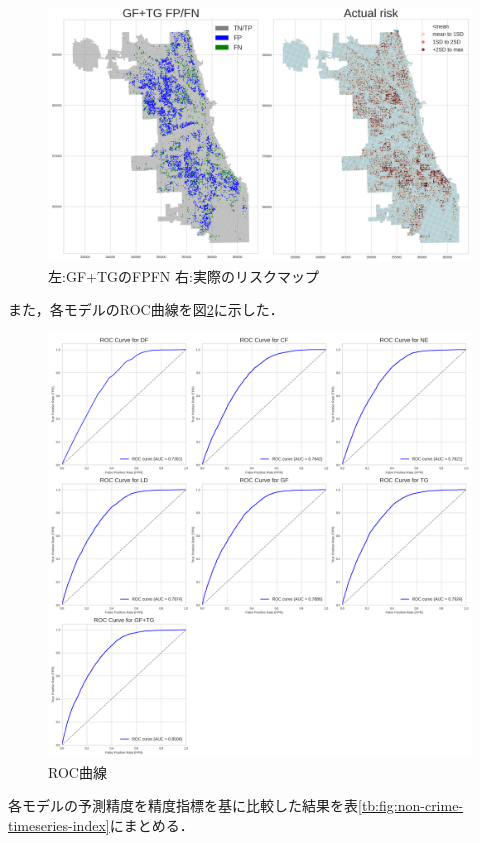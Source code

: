 \begin{figure}
  \centering %
  \includegraphics[scale=0.25]{./non-crime-timeseries-fig/GF+TG_fnp.png}
  \caption{左:GF+TGのFPFN 右:実際のリスクマップ}
  \label{fig:non-crime-timeseries-gf-tg-fnp}
\end{figure}
また，各モデルのROC曲線を図\ref{fig:non-crime-timeseries-roc}に示した．

\begin{figure}
  \centering %
  \includegraphics[scale=0.25]{./non-crime-timeseries-fig/roc_auc.png}
  \caption{ROC曲線}
  \label{fig:non-crime-timeseries-roc}
\end{figure}
各モデルの予測精度を精度指標を基に比較した結果を表\ref{tb:fig:non-crime-timeseries-index}にまとめる．

